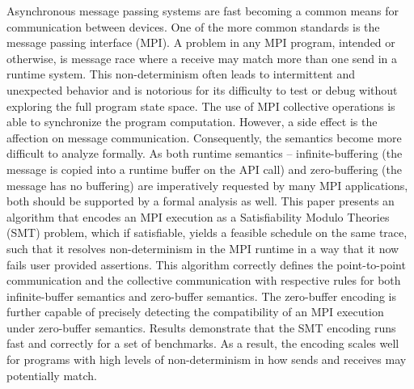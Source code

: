 Asynchronous message passing systems are fast becoming a common means for communication between devices.
%
One of the more common standards is the message passing interface (MPI).
%
A problem in any MPI program, intended or otherwise, is message race where a receive may match more than one send in a runtime system.
%
This non-determinism often leads to intermittent and unexpected behavior and is notorious for its difficulty to test or debug without exploring the full program state space. 
%
The use of MPI collective operations is able to synchronize the program computation. 
%
However, a side effect is the affection on message communication.
%
Consequently, the semantics become more difficult to analyze formally. 
%
As both runtime semantics -- infinite-buffering (the message is copied into a runtime buffer on the API call) and zero-buffering (the message has no buffering) are imperatively requested by many MPI applications, both should be supported by a formal analysis as well. 
%
This paper presents an algorithm that encodes an MPI execution as a Satisfiability Modulo Theories (SMT) problem, which if satisfiable, yields a feasible schedule on the same trace, such that it resolves non-determinism in the MPI runtime in a way that it now fails user provided assertions.
%
This algorithm correctly defines the point-to-point communication and the collective communication with respective rules for both infinite-buffer semantics and zero-buffer semantics. 
%
The zero-buffer encoding is further capable of precisely detecting the compatibility of an MPI execution under zero-buffer semantics.
%
Results demonstrate that the SMT encoding runs fast and correctly for a set of benchmarks. 
%
As a result, the encoding scales well for programs with high levels of non-determinism in how sends and receives may potentially match.